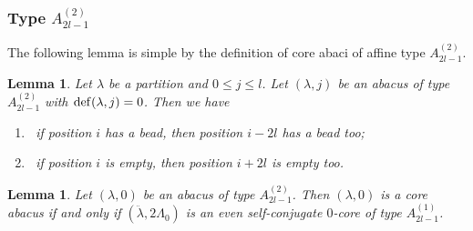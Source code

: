 \documentclass[11pt]{amsart}
\theoremstyle{plain}
\numberwithin{equation}{subsection}
\newtheorem{lemma}[theorem]{Lemma}
\newcommand{\lam}{\lambda}
\begin{document}

\subsubsection{Type $A_{2l-1}^{(2)}$} 
The following lemma is simple by the definition of core abaci of affine type $A_{2l-1}^{(2)}$.
\begin{lemma}\label{3.23}
Let  $\lam$ be a partition and $0\leq j\leq l$. Let $(\lambda, j)$ be an abacus of type $A_{2l-1}^{(2)}$ with ${\rm def}(\lambda, j)=0$. Then we have
\begin{enumerate}
  \item [\rm (1)]\, if position $i$ has a bead, then position $i-2l$ has a bead too;
  \item [\rm (2)]\, if position $i$ is empty, then position $i+2l$ is empty too.
\end{enumerate}	
\end{lemma}

\begin{lemma}\label{3.24}
Let $(\lambda, 0)$ be an abacus of type $A_{2l-1}^{(2)}$. Then $(\lambda, 0)$ is a core abacus if and only if 
$(\ddot{\lambda}, 2\Lambda_0)$ is an even self-conjugate $0$-core of type $A_{2l-1}^{(1)}$.
\end{lemma}
\end{document}
